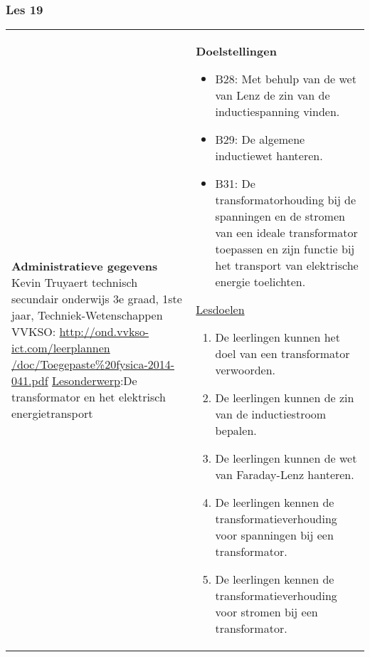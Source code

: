 


\begin{landscape}
	\subsubsection{Les 19}
	\begin{tabularx}{1.56\textwidth}{|p{}|X|}\hline
		\textbf{Administratieve gegevens}\newline\newline
		Kevin Truyaert\newline\newline
		technisch secundair onderwijs\newline
		3e graad, 1ste jaar, Techniek-Wetenschappen\newline
		VVKSO: \href{http://ond.vvkso-ict.com/leerplannen/doc/Toegepaste\%20fysica-2014-041.pdf}{http://ond.vvkso-ict.com/leerplannen /doc/Toegepaste\%20fysica-2014-041.pdf} \newline
		\underline{Lesonderwerp}:\newline De transformator en het elektrisch energietransport  & \textbf{Doelstellingen}
		\begin{itemize}[itemsep=0.08\baselineskip]
			\item B28: Met behulp van de wet van Lenz de zin van de inductiespanning vinden.
			\item B29: De algemene inductiewet hanteren.
			\item B31: De transformatorhouding bij de spanningen en de stromen van een ideale transformator toepassen en zijn functie bij het transport van elektrische energie toelichten.
		\end{itemize}
		\underline{Lesdoelen}\newline
		\vspace{-0.75cm}
		\begin{enumerate}[itemsep=0.08\baselineskip]
			\item De leerlingen kunnen het doel van een transformator verwoorden.
			\item De leerlingen kunnen de zin van de inductiestroom bepalen.
			\item De leerlingen kunnen de wet van Faraday-Lenz hanteren.
			\item De leerlingen kennen de transformatieverhouding voor spanningen bij een transformator.
			\item De leerlingen kennen de transformatieverhouding voor stromen bij een transformator.

\end{enumerate}
\end{tabularx}
\end{landscape}

